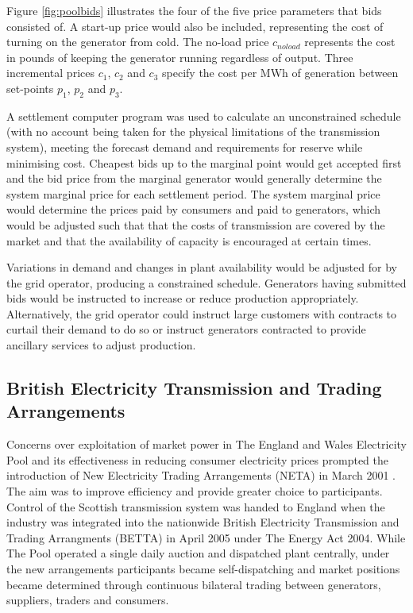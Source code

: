 

Figure \ref{fig:poolbids} illustrates the four of the five price parameters
that bids consisted of.  A start-up price would also be included, representing the cost of turning
on the generator from cold.  The no-load price $c_{noload}$ represents the
cost in pounds of keeping the generator running regardless of output. Three
incremental prices $c_1$, $c_2$ and $c_3$ specify the cost per MWh of
generation between set-points $p_1$, $p_2$ and $p_3$.

A settlement computer program was used to calculate an unconstrained schedule
(with no account being taken for the physical limitations of the transmission
system), meeting the forecast demand and requirements for reserve while minimising cost.
Cheapest bids up to the marginal point would get accepted first and the bid
price from the marginal generator would generally determine the system marginal
price for each settlement period.  The system marginal price would determine
the prices paid by consumers and paid to generators, which would be adjusted
such that that the costs of transmission are covered by the market and that the
availability of capacity is encouraged at certain times.

Variations in demand and changes in plant availability would be adjusted for by
the grid operator, producing a constrained schedule.  Generators having
submitted bids would be instructed to increase or reduce production
appropriately.  Alternatively, the grid operator could instruct large customers
with contracts to curtail their demand to do so or instruct generators
contracted to provide ancillary services to adjust production.

\subsection{British Electricity Transmission and Trading Arrangements}
\label{sec:betta}
Concerns over exploitation of market power in The England and Wales Electricity
Pool and its effectiveness in reducing consumer electricity prices prompted the
introduction of New Electricity Trading Arrangements (NETA) in March 2001
\cite{martoccia:2005}.  The aim was to improve efficiency and provide greater
choice to participants.  Control of the Scottish transmission system was
handed to England when the industry was integrated into the nationwide British
Electricity Transmission and Trading Arrangments (BETTA) in April 2005 under The Energy
Act 2004.  While The Pool operated a single daily auction and dispatched
plant centrally, under the new arrangements participants became
self-dispatching and market positions became determined through continuous
bilateral trading between generators, suppliers, traders and consumers.

